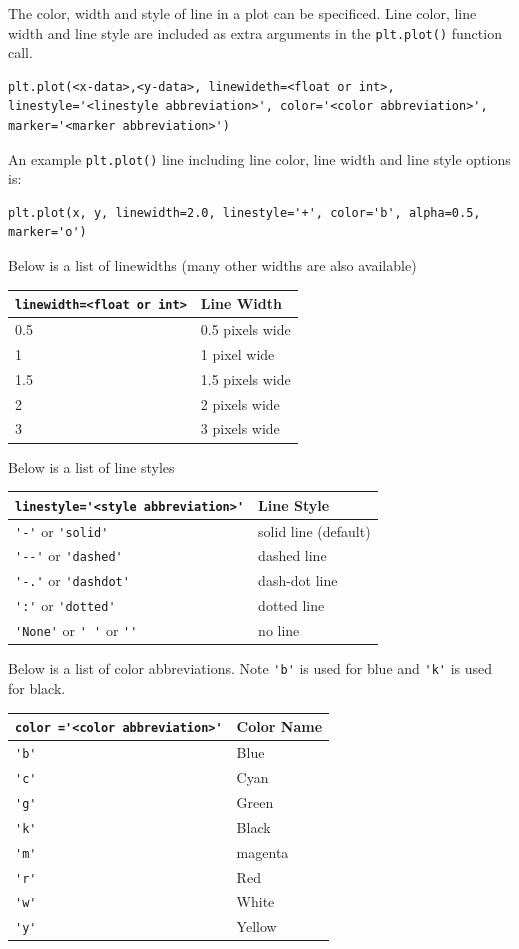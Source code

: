 \documentclass{book}
\begin{document}
The color, width and style of line in a plot can be specificed. Line
color, line width and line style are included as extra arguments in the
\lstinline!plt.plot()! function call.

\begin{lstlisting}
plt.plot(<x-data>,<y-data>, linewideth=<float or int>, linestyle='<linestyle abbreviation>', color='<color abbreviation>', marker='<marker abbreviation>')
\end{lstlisting}

An example \lstinline!plt.plot()! line including line color, line width
and line style options is:

\begin{lstlisting}
plt.plot(x, y, linewidth=2.0, linestyle='+', color='b', alpha=0.5, marker='o')
\end{lstlisting}

Below is a list of linewidths (many other widths are also available)

\begin{longtable}[]{@{}ll@{}}
\toprule
\lstinline!linewidth=<float or int>! & Line Width\tabularnewline
\midrule
\endhead
0.5 & 0.5 pixels wide\tabularnewline
1 & 1 pixel wide\tabularnewline
1.5 & 1.5 pixels wide\tabularnewline
2 & 2 pixels wide\tabularnewline
3 & 3 pixels wide\tabularnewline
\bottomrule
\end{longtable}

Below is a list of line styles

\begin{longtable}[]{@{}ll@{}}
\toprule
\lstinline!linestyle='<style abbreviation>'! & Line Style\tabularnewline
\midrule
\endhead
\lstinline!'-'! or \lstinline!'solid'! & solid line
(default)\tabularnewline
\lstinline!'--'! or \lstinline!'dashed'! & dashed line\tabularnewline
\lstinline!'-.'! or \lstinline!'dashdot'! & dash-dot line\tabularnewline
\lstinline!':'! or \lstinline!'dotted'! & dotted line\tabularnewline
\lstinline!'None'! or \lstinline!' '! or \lstinline!''! & no
line\tabularnewline
\bottomrule
\end{longtable}

Below is a list of color abbreviations. Note \lstinline!'b'! is used for
blue and \lstinline!'k'! is used for black.

\begin{longtable}[]{@{}ll@{}}
\toprule
\lstinline!color ='<color abbreviation>'! & Color Name\tabularnewline
\midrule
\endhead
\lstinline!'b'! & Blue\tabularnewline
\lstinline!'c'! & Cyan\tabularnewline
\lstinline!'g'! & Green\tabularnewline
\lstinline!'k'! & Black\tabularnewline
\lstinline!'m'! & magenta\tabularnewline
\lstinline!'r'! & Red\tabularnewline
\lstinline!'w'! & White\tabularnewline
\lstinline!'y'! & Yellow\tabularnewline
\bottomrule
\end{longtable}
\end{document}
